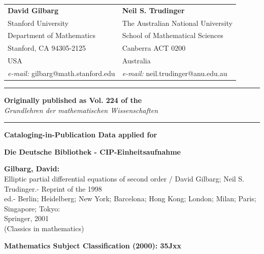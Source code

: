\begin{center}
\begin{tabular}{@{}p{}p{}@{}}
\textbf{David Gilbarg} &
\textbf{Neil S. Trudinger} \\
Stanford University &
The Australian National University \\
Department of Mathematics &
School of Mathematical Sciences \\
Stanford, CA 94305-2125 &
Canberra ACT 0200 \\
USA &
Australia \\
\textit{e-mail:} gilbarg@math.stanford.edu &
\textit{e-mail:} neil.trudinger@anu.edu.au
\end{tabular}
\end{center}

\vspace{2.5em}

\noindent\rule{\textwidth}{0.4pt}

\noindent\textbf{Originally published as Vol. 224 of the}\\
\textit{Grundlehren der mathematischen Wissenschaften}

\noindent\rule{\textwidth}{0.4pt}

\vspace{2.0em}

\noindent\textbf{Cataloging-in-Publication Data applied for}

\vspace{1.5em}

\noindent\textbf{Die Deutsche Bibliothek - CIP-Einheitsaufnahme}

\vspace{1.5em}

\noindent\textbf{Gilbarg, David:}\\
Elliptic partial differential equations of second order / David Gilbarg; Neil S. Trudinger.- Reprint of the 1998\\
ed.- Berlin; Heidelberg; New York; Barcelona; Hong Kong; London; Milan; Paris; Singapore; Tokyo:\\
Springer, 2001\\
(Classics in mathematics)

\vspace{3.0em}

\noindent\textbf{Mathematics Subject Classification (2000): 35Jxx}

\vspace{3.0em}

